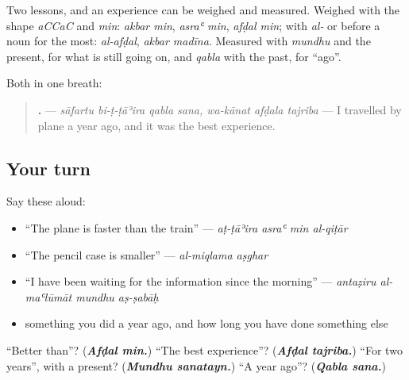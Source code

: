 \begin{grammarlens}[title={What you've built}]
Two lessons, and an experience can be weighed and measured. Weighed with the shape \emph{aCCaC} and \emph{min}: \emph{akbar min}, \emph{asraʿ min}, \emph{afḍal min}; with \emph{al-} or before a noun for the most: \emph{al-afḍal}, \emph{akbar madīna}. Measured with \emph{mundhu} and the present, for what is still going on, and \emph{qabla} with the past, for \textquotedblleft{}ago\textquotedblright{}.

Both in one breath:

\begin{quote}
\textbf{      .} — \emph{sāfartu bi-ṭ-ṭāʾira qabla sana, wa-kānat afḍala tajriba} — I travelled by plane a year ago, and it was the best experience.
\end{quote}
\end{grammarlens}

\subsection*{Your turn}
Say these aloud:

\begin{itemize}
\raggedright
  \item \textquotedblleft{}The plane is faster than the train\textquotedblright{} — \emph{aṭ-ṭāʾira asraʿ min al-qiṭār}
  \item \textquotedblleft{}The pencil case is smaller\textquotedblright{} — \emph{al-miqlama aṣghar}
  \item \textquotedblleft{}I have been waiting for the information since the morning\textquotedblright{} — \emph{antaẓiru al-maʿlūmāt mundhu aṣ-ṣabāḥ}
  \item something you did a year ago, and how long you have done something else
\end{itemize}

\begin{tcolorbox}[breakable,colback=teal!4,colframe=teal!35!black,title={Before you move on}]
\textquotedblleft{}Better than\textquotedblright{}? (\emph{\textbf{Afḍal min.}}) \textquotedblleft{}The best experience\textquotedblright{}? (\emph{\textbf{Afḍal tajriba.}}) \textquotedblleft{}For two years\textquotedblright{}, with a present? (\emph{\textbf{Mundhu sanatayn.}}) \textquotedblleft{}A year ago\textquotedblright{}? (\emph{\textbf{Qabla sana.}})
\end{tcolorbox}
